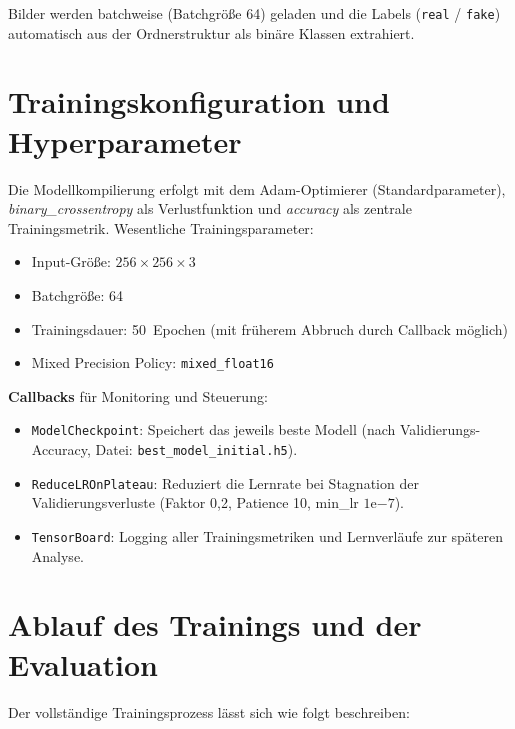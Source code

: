Bilder werden batchweise (Batchgröße 64) geladen und die Labels (\texttt{real} / \texttt{fake}) automatisch aus der Ordnerstruktur als binäre Klassen extrahiert.

\section{Trainingskonfiguration und Hyperparameter}

Die Modellkompilierung erfolgt mit dem Adam-Optimierer (Standardparameter), \emph{binary\_crossentropy} als Verlustfunktion und \emph{accuracy} als zentrale Trainingsmetrik. Wesentliche Trainingsparameter:

\begin{itemize}
    \item Input-Größe: $256\times256\times3$
    \item Batchgröße: 64
    \item Trainingsdauer: 50~Epochen (mit früherem Abbruch durch Callback möglich)
    \item Mixed Precision Policy: \texttt{mixed\_float16}
\end{itemize}

\textbf{Callbacks} für Monitoring und Steuerung:

\begin{itemize}
    \item \texttt{ModelCheckpoint}: Speichert das jeweils beste Modell (nach Validierungs-Accuracy, Datei: \texttt{best\_model\_initial.h5}).
    \item \texttt{ReduceLROnPlateau}: Reduziert die Lernrate bei Stagnation der Validierungsverluste (Faktor 0{,}2, Patience 10, min\_lr $1\mathrm{e}{-7}$).
    \item \texttt{TensorBoard}: Logging aller Trainingsmetriken und Lernverläufe zur späteren Analyse.
\end{itemize}

\section{Ablauf des Trainings und der Evaluation}

Der vollständige Trainingsprozess lässt sich wie folgt beschreiben:

